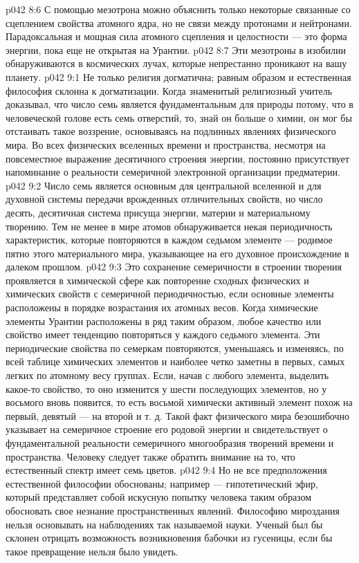 \vs p042 8:6 С помощью мезотрона можно объяснить только некоторые связанные со сцеплением свойства атомного ядра, но не связи между протонами и нейтронами. Парадоксальная и мощная сила атомного сцепления и целостности --- это форма энергии, пока еще не открытая на Урантии.
\vs p042 8:7 Эти мезотроны в изобилии обнаруживаются в космических лучах, которые непрестанно проникают на вашу планету.
\vs p042 9:1 Не только религия догматична; равным образом и естественная философия склонна к догматизации. Когда знаменитый религиозный учитель доказывал, что число семь является фундаментальным для природы потому, что в человеческой голове есть семь отверстий, то, знай он больше о химии, он мог бы отстаивать такое воззрение, основываясь на подлинных явлениях физического мира. Во всех физических вселенных времени и пространства, несмотря на повсеместное выражение десятичного строения энергии, постоянно присутствует напоминание о реальности семеричной электронной организации предматерии.
\vs p042 9:2 Число семь является основным для центральной вселенной и для духовной системы передачи врожденных отличительных свойств, но число десять, десятичная система присуща энергии, материи и материальному творению. Тем не менее в мире атомов обнаруживается некая периодичность характеристик, которые повторяются в каждом седьмом элементе --- родимое пятно этого материального мира, указывающее на его духовное происхождение в далеком прошлом.
\vs p042 9:3 Это сохранение семеричности в строении творения проявляется в химической сфере как повторение сходных физических и химических свойств с семеричной периодичностью, если основные элементы расположены в порядке возрастания их атомных весов. Когда химические элементы Урантии расположены в ряд таким образом, любое качество или свойство имеет тенденцию повторяться у каждого седьмого элемента. Эти периодические свойства по семеркам повторяются, уменьшаясь и изменяясь, по всей таблице химических элементов и наиболее четко заметны в первых, самых легких по атомному весу группах. Если, начав с любого элемента, выделить какое\hyp{}то свойство, то оно изменится у шести последующих элементов, но у восьмого вновь появится, то есть восьмой химически активный элемент похож на первый, девятый --- на второй и т. д. Такой факт физического мира безошибочно указывает на семеричное строение его родовой энергии и свидетельствует о фундаментальной реальности семеричного многообразия творений времени и пространства. Человеку следует также обратить внимание на то, что естественный спектр имеет семь цветов.
\vs p042 9:4 Но не все предположения естественной философии обоснованы; например --- гипотетический эфир, который представляет собой искусную попытку человека таким образом обосновать свое незнание пространственных явлений. Философию мироздания нельзя основывать на наблюдениях так называемой науки. Ученый был бы склонен отрицать возможность возникновения бабочки из гусеницы, если бы такое превращение нельзя было увидеть.
